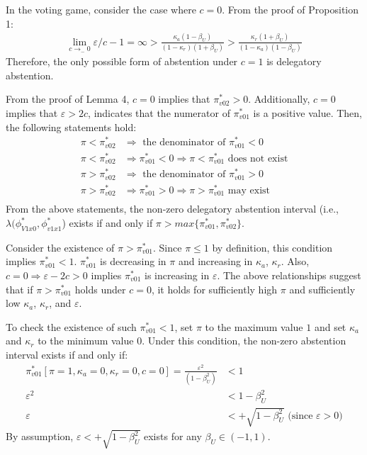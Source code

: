 \par In the voting game, consider the case where $c=0$. From the proof of Proposition 1:
\begin{align*}
\lim_{c \to_{-} 0} \varepsilon/c - 1 = \infty > \frac{\kappa_a(1-\beta_U)}{(1-\kappa_r)(1+\beta_U)} > \frac{\kappa_r(1+\beta_U)}{(1-\kappa_a)(1-\beta_U)}
\end{align*}
\noindent Therefore, the only possible form of abstention under $c=1$ is delegatory abstention. 

\par From the proof of Lemma 4, $c=0$ implies that $\pi^*_{v02}>0$. Additionally, $c=0$ implies that $\varepsilon > 2c$, indicates that the numerator of $\pi^*_{v01}$ is a positive value. Then, the following statements hold:
\begin{align*}
\pi<\pi^*_{v02} &\Rightarrow \text{ the denominator of $\pi^*_{v01} < 0$} \\
\pi<\pi^*_{v02} &\Rightarrow \pi^*_{v01} < 0 \Rightarrow \pi < \pi^*_{v01} \text{ does not exist} \\
\pi>\pi^*_{v02} &\Rightarrow \text{ the denominator of $\pi^*_{v01} > 0$} \\
\pi>\pi^*_{v02} &\Rightarrow \pi^*_{v01} > 0 \Rightarrow \pi > \pi^*_{v01} \text{ may exist} \\
\end{align*}
\noindent From the above statements, the non-zero delegatory abstention interval (i.e., $\lambda(\phi^*_{V1x0},\phi^*_{v1x1}$) exists if and only if $\pi > max\{\pi^*_{v01},\pi^*_{v02}\}$.

\par Consider the existence of $\pi > \pi^*_{v01}$. Since $\pi \leq 1$ by definition, this condition implies $\pi^*_{v01} < 1$. $\pi^*_{v01}$ is decreasing in $\pi$ and increasing in $\kappa_a$, $\kappa_r$. Also, $c=0 \Rightarrow \varepsilon - 2c > 0$ implies $\pi^*_{v01}$ is increasing in $\varepsilon$. The above relationships suggest that if $\pi > \pi^*_{v01}$ holds under $c=0$, it holds for sufficiently high $\pi$ and sufficiently low $\kappa_a$, $\kappa_r$, and $\varepsilon$.

\par To check the existence of such $\pi^*_{v01} < 1$, set $\pi$ to the maximum value $1$ and set $\kappa_a$ and $\kappa_r$ to the minimum value $0$. Under this condition, the non-zero abstention interval exists if and only if:
\begin{align*}
\pi^*_{v01}[\pi=1,\kappa_a=0,\kappa_r=0,c=0] = \frac{\varepsilon^2 }{(1 - \beta_U^2)} &< 1\\
\varepsilon^2 &< 1 - \beta_U^2 \\
\varepsilon &< +\sqrt{1 - \beta_U^2} \text{ (since $\varepsilon>0$)} 
\end{align*}
\noindent By assumption, $\varepsilon < +\sqrt{1 - \beta_U^2}$ exists for any $\beta_U \in (-1,1)$. 

